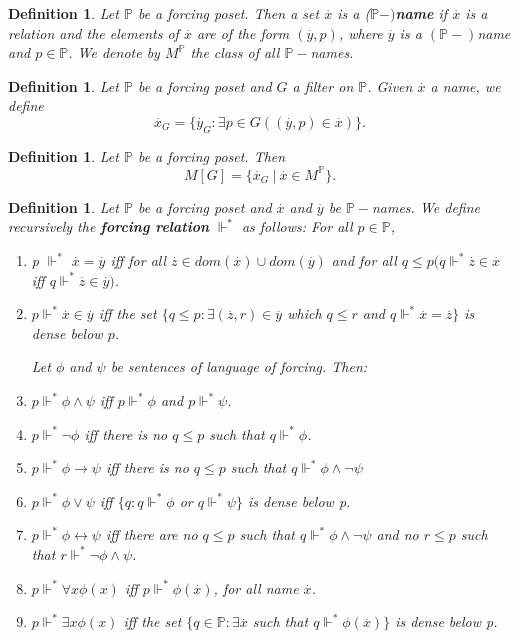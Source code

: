 \documentclass[10pt,longbibliography]{article}
\newtheorem{Def}[Theo]{Definition}
\newcommand{\Po}{\mathbb{P}}
\newcommand{\ydot}{\overset{.}{y}}
\newcommand{\zdot}{\overset{.}{z}}
\newcommand{\xdot}{\overset{.}{x}}
\newcommand{\forces}{\Vdash^{*}}
\begin{document}
\begin{Def}\label{Pnamesdef}
	Let $\Po$ be a forcing poset. Then a set $\xdot$ is a ($\Po-)$\textbf{name} if $\xdot$ is a relation and the elements of $\xdot$ are of the form $(\ydot,p)$, where $\ydot$ is a $(\Po-)$name and $p \in \Po$. We denote by $M^{\Po}$ the class of all $\Po-$names. 
\end{Def}

\begin{Def}
	Let $\Po$ be a forcing poset and $G$ a filter on $\Po$. Given $\xdot$ a name, we define
	$$ \xdot_{G} = \{\ydot_{G}: \exists p \in G((\ydot,p) \in \xdot)\}.$$
	
\end{Def}

\begin{Def}
	Let $\Po$ be a forcing poset. Then 
	$$M[G] = \{\xdot_{G}~|~ \xdot \in M^{\Po}\}.$$
\end{Def}


\begin{Def}\label{forcingestreladef}
	Let $\Po$ be a forcing poset and $\xdot$ and $\ydot$ be $\Po-$names. We define recursively the \textbf{forcing relation} $\Vdash^*$ as follows: For all $p \in \Po$,
	\begin{enumerate}
		\item  p  $\Vdash^*$ $\xdot = \ydot$ iff for all $ \zdot \in dom(\xdot) \cup dom(\ydot)$ and for all $q \leq p(q \Vdash^* \zdot \in \xdot $ iff $q \Vdash^*  \zdot \in \ydot)$.  
		\item $p \Vdash^* \xdot \in \ydot $ iff the set $\{q \leq p: \exists (\zdot,r) \in \ydot$ which $q \leq r $ and $ q \Vdash^* \xdot = \zdot \}$ is dense below $p$.
		
		Let $\phi$ and $\psi$ be sentences of language of forcing. Then: 
		
		\item $p \forces \phi \land \psi$ iff $p \forces \phi$ and $p \forces \psi$.
		
		\item $p \forces \neg \phi$ iff  there is no $q \leq p$ such that $q \forces \phi$.
		
		\item $p \forces \phi \to \psi$ iff there is no $q \leq p$ such that $q \forces \phi \land \neg \psi$ 
		
		\item $p \forces \phi \lor \psi$ iff $\{q: q \forces \phi$ or $q \forces \psi \}$ is dense below p.
		\item $p \forces \phi \leftrightarrow \psi$ iff there are no $q \leq p$ such that $q \forces \phi \land \neg \psi$ and no $r \leq p$ such that $r \forces \neg \phi \land \psi$.
		\item $p \forces \forall x \phi(x)$ iff $p \forces \phi(\xdot)$, for all name $\xdot$.
		
		\item $p \forces \exists x\phi(x)$ iff the set $\{q \in \Po: \exists \xdot$ such that $q \forces \phi(\xdot)\}$ is dense below p.
		
	\end{enumerate}

\end{Def}
\end{document}
